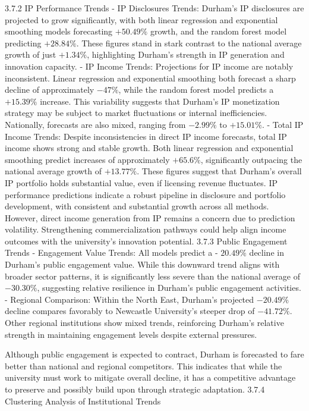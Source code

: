 3.7.2 IP Performance Trends
- IP Disclosures Trends: Durham's IP disclosures are projected to grow significantly, with both linear regression and exponential smoothing models forecasting $+50.49 \%$ growth, and the random forest model predicting $+28.84 \%$. These figures stand in stark contrast to the national average growth of just $+1.34 \%$, highlighting Durham's strength in IP generation and innovation capacity.
- IP Income Trends: Projections for IP income are notably inconsistent. Linear regression and exponential smoothing both forecast a sharp decline of approximately $-47 \%$, while the random forest model predicts a $+15.39 \%$ increase. This variability suggests that Durham's IP monetization strategy may be subject to market fluctuations or internal inefficiencies. Nationally, forecasts are also mixed, ranging from $-2.99 \%$ to $+15.01 \%$.
- Total IP Income Trends: Despite inconsistencies in direct IP income forecasts, total IP income shows strong and stable growth. Both linear regression and exponential smoothing predict increases of approximately $+65.6 \%$, significantly outpacing the national average growth of $+13.77 \%$. These figures suggest that Durham's overall IP portfolio holds substantial value, even if licensing revenue fluctuates.
IP performance predictions indicate a robust pipeline in disclosure and portfolio development, with consistent and substantial growth across all methods. However, direct income generation from IP remains a concern due to prediction volatility. Strengthening commercialization pathways could help align income outcomes with the university's innovation potential.
3.7.3 Public Engagement Trends
- Engagement Value Trends: All models predict a - $20.49 \%$ decline in Durham's public engagement value. While this downward trend aligns with broader sector patterns, it is significantly less severe than the national average of $-30.30 \%$, suggesting relative resilience in Durham's public engagement activities.
- Regional Comparison: Within the North East, Durham's projected $-20.49 \%$ decline compares favorably to Newcastle University's steeper drop of $-41.72 \%$. Other regional institutions show mixed trends, reinforcing Durham's relative strength in maintaining engagement levels despite external pressures.

Although public engagement is expected to contract, Durham is forecasted to fare better than national and regional competitors. This indicates that while the university must work to mitigate overall decline, it has a competitive advantage to preserve and possibly build upon through strategic adaptation.
3.7.4 Clustering Analysis of Institutional Trends

